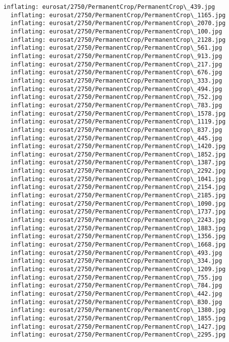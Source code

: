 \documentclass[11pt]{article}
\begin{document}
\begin{Verbatim}[commandchars=\\\{\}]
  inflating: eurosat/2750/PermanentCrop/PermanentCrop\_439.jpg
  inflating: eurosat/2750/PermanentCrop/PermanentCrop\_1165.jpg
  inflating: eurosat/2750/PermanentCrop/PermanentCrop\_2070.jpg
  inflating: eurosat/2750/PermanentCrop/PermanentCrop\_100.jpg
  inflating: eurosat/2750/PermanentCrop/PermanentCrop\_2128.jpg
  inflating: eurosat/2750/PermanentCrop/PermanentCrop\_561.jpg
  inflating: eurosat/2750/PermanentCrop/PermanentCrop\_913.jpg
  inflating: eurosat/2750/PermanentCrop/PermanentCrop\_217.jpg
  inflating: eurosat/2750/PermanentCrop/PermanentCrop\_676.jpg
  inflating: eurosat/2750/PermanentCrop/PermanentCrop\_333.jpg
  inflating: eurosat/2750/PermanentCrop/PermanentCrop\_494.jpg
  inflating: eurosat/2750/PermanentCrop/PermanentCrop\_752.jpg
  inflating: eurosat/2750/PermanentCrop/PermanentCrop\_783.jpg
  inflating: eurosat/2750/PermanentCrop/PermanentCrop\_1578.jpg
  inflating: eurosat/2750/PermanentCrop/PermanentCrop\_1119.jpg
  inflating: eurosat/2750/PermanentCrop/PermanentCrop\_837.jpg
  inflating: eurosat/2750/PermanentCrop/PermanentCrop\_445.jpg
  inflating: eurosat/2750/PermanentCrop/PermanentCrop\_1420.jpg
  inflating: eurosat/2750/PermanentCrop/PermanentCrop\_1852.jpg
  inflating: eurosat/2750/PermanentCrop/PermanentCrop\_1387.jpg
  inflating: eurosat/2750/PermanentCrop/PermanentCrop\_2292.jpg
  inflating: eurosat/2750/PermanentCrop/PermanentCrop\_1041.jpg
  inflating: eurosat/2750/PermanentCrop/PermanentCrop\_2154.jpg
  inflating: eurosat/2750/PermanentCrop/PermanentCrop\_2185.jpg
  inflating: eurosat/2750/PermanentCrop/PermanentCrop\_1090.jpg
  inflating: eurosat/2750/PermanentCrop/PermanentCrop\_1737.jpg
  inflating: eurosat/2750/PermanentCrop/PermanentCrop\_2243.jpg
  inflating: eurosat/2750/PermanentCrop/PermanentCrop\_1883.jpg
  inflating: eurosat/2750/PermanentCrop/PermanentCrop\_1356.jpg
  inflating: eurosat/2750/PermanentCrop/PermanentCrop\_1668.jpg
  inflating: eurosat/2750/PermanentCrop/PermanentCrop\_493.jpg
  inflating: eurosat/2750/PermanentCrop/PermanentCrop\_334.jpg
  inflating: eurosat/2750/PermanentCrop/PermanentCrop\_1209.jpg
  inflating: eurosat/2750/PermanentCrop/PermanentCrop\_755.jpg
  inflating: eurosat/2750/PermanentCrop/PermanentCrop\_784.jpg
  inflating: eurosat/2750/PermanentCrop/PermanentCrop\_442.jpg
  inflating: eurosat/2750/PermanentCrop/PermanentCrop\_830.jpg
  inflating: eurosat/2750/PermanentCrop/PermanentCrop\_1380.jpg
  inflating: eurosat/2750/PermanentCrop/PermanentCrop\_1855.jpg
  inflating: eurosat/2750/PermanentCrop/PermanentCrop\_1427.jpg
  inflating: eurosat/2750/PermanentCrop/PermanentCrop\_2295.jpg

\end{Verbatim}
\end{document}
